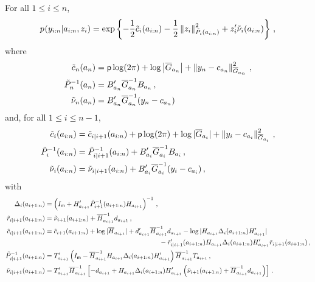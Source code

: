 \begin{lemma}
\label{lem:py}
For all $1\le i \le n$,
\begin{equation}
\label{eq:py}
p_{}(y_{i:n}|a_{i:n},z_i) =  \exp\left\{-\frac{1}{2}\tilde{c}_{i}(a_{i:n}) - \frac{1}{2}\normMat{\tilde{P}_{i}(a_{i:n})}{z_i}^2 + z'_i\tilde{\nu}_{i}(a_{i:n})\right\}\eqsp,
\end{equation}
where
\begin{align}
\tilde{c}_{n}(a_{n}) &= \dimy\log(2\pi) + \log \left|\barG_{a_n}\right| + \normMat{\barG_{a_n}}{y_n-c_{a_n}}^2\eqsp,\label{eq:cn}\\
\tilde{P}_{n}^{-1}(a_{n}) &=B'_{a_n}\barG_{a_n}^{-1}B_{a_n}\eqsp,\label{eq:Pn}\\
\tilde{\nu}_{n}(a_{n})&=B'_{a_n}\barG_{a_n}^{-1}(y_n-c_{a_n})\label{eq:nun}
\end{align}
and, for all $1\le i\le n-1$,
\begin{align}
\tilde{c}_{i}(a_{i:n}) &= \tilde{c}_{i|i+1}(a_{i:n}) + \dimy\log(2\pi)  + \log|\barG_{a_i}| + \normMat{\barG_{a_i}}{y_i-c_{a_i}}^2\eqsp,\label{eq:ck}\\
\tilde{P}_{i}^{-1}(a_{i:n}) &= \tilde{P}_{i|i+1}^{-1}(a_{i:n}) + B'_{a_i}\barG_{a_i}^{-1}B_{a_i}\eqsp,\label{eq:Pk}\\
\tilde{\nu}_{i}(a_{i:n})&=\tilde{\nu}_{i|i+1}(a_{i:n}) + B'_{a_i}\barG_{a_i}^{-1}(y_{i}-c_{a_{i}})\eqsp,\label{eq:nuk}
\end{align}
with
\begin{align*}
\Delta_{i}(a_{i+1:n}) &= \left(I_{\dimz} + H'_{a_{i+1}}\tilde{P}_{i+1}^{-1}(a_{i+1:n})H_{a_{i+1}}\right)^{-1}\eqsp,\\
\tilde{r}_{i|i+1}(a_{i+1:n})&= \tilde{\nu}_{i+1}(a_{i+1:n}) + \barH_{a_{i+1}}^{-1}d_{a_{i+1}}\eqsp,\\
\tilde{c}_{i|i+1}(a_{i+1:n}) &= \tilde{c}_{i+1}(a_{i+1:n}) + \log|\barH_{a_{i+1}}| + d'_{a_{i+1}}\barH_{a_{i+1}}^{-1}d_{a_{i+1}}-\log|H_{a_{i+1}}\Delta_{i}(a_{i+1:n})H'_{a_{i+1}}|\\
&\hspace{6cm} - \tilde{r}'_{i|i+1}(a_{i+1:n})H_{a_{i+1}}\Delta_{i}(a_{i+1:n})H'_{a_{i+1}}\tilde{r}_{i|i+1}(a_{i+1:n})\eqsp,\\
\tilde{P}_{i|i+1}^{-1}(a_{i+1:n}) &=T'_{a_{i+1}}\left(I_{\dimz}-\barH_{a_{i+1}}^{-1}H_{a_{i+1}}\Delta_{i}(a_{i+1:n})H'_{a_{i+1}}\right)\barH_{a_{i+1}}^{-1}T_{a_{i+1}}\eqsp,\\
\tilde{\nu}_{i|i+1}(a_{i+1:n})&=T'_{a_{i+1}}\barH_{a_{i+1}}^{-1}\left[-d_{a_{i+1}}+H_{a_{i+1}}\Delta_{i}(a_{i+1:n})H'_{a_{i+1}}\left(\tilde{\nu}_{i+1}(a_{i+1:n})+\barH_{a_{i+1}}^{-1}d_{a_{i+1}}\right)\right]\eqsp.
\end{align*}
\end{lemma}
